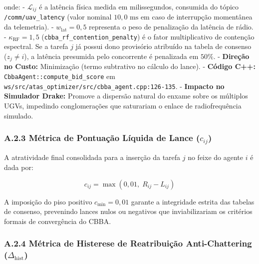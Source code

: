 \documentclass[
  brazilian,
  a4paper]{article}
\begin{document}
onde: - \(\mathcal{L}_{ij}\) é a latência física medida em
milissegundos, consumida do tópico \texttt{/\allowbreak{}comm/\allowbreak{}uav\_\allowbreak{}latency} (valor
nominal \(10{,}0\text{ ms}\) em caso de interrupção momentânea da
telemetria). - \(w_{\text{lat}} = 0{,}5\) representa o peso de
penalização da latência de rádio. - \(\kappa_{\text{RF}} = 1{,}5\)
(\texttt{cbba\_\allowbreak{}rf\_\allowbreak{}contention\_\allowbreak{}penalty}) é o fator multiplicativo de
contenção espectral. Se a tarefa \(j\) já possui dono provisório
atribuído na tabela de consenso (\(z_j \ne i\)), a latência presumida
pelo concorrente é penalizada em \(50\%\). - \textbf{Direção no Custo:}
Minimização (termo subtrativo no cálculo do lance). - \textbf{Código
C++:} \texttt{CbbaAgent:\allowbreak{}:\allowbreak{}compute\_\allowbreak{}bid\_\allowbreak{}score} em
\texttt{ws/\allowbreak{}src/\allowbreak{}atas\_\allowbreak{}optimizer/\allowbreak{}src/\allowbreak{}cbba\_\allowbreak{}agent.\allowbreak{}cpp:\allowbreak{}126-135}. -
\textbf{Impacto no Simulador Drake:} Promove a dispersão natural do
enxame sobre os múltiplos UGVs, impedindo conglomerações que saturariam
o enlace de radiofrequência simulado.

\subsubsection{\texorpdfstring{A.2.3 Métrica de Pontuação Líquida de
Lance
(\(c_{ij}\))}{A.2.3 Métrica de Pontuação Líquida de Lance (c\_\{ij\})}}\label{a.2.3-muxe9trica-de-pontuauxe7uxe3o-luxedquida-de-lance-c_ij}

A atratividade final consolidada para a inserção da tarefa \(j\) no
feixe do agente \(i\) é dada por:

\[c_{ij} = \max\left(0{,}01, \; R_{ij} - L_{ij}\right)\]

A imposição do piso positivo \(c_{\text{min}} = 0{,}01\) garante a
integridade estrita das tabelas de consenso, prevenindo lances nulos ou
negativos que inviabilizariam os critérios formais de convergência do
CBBA.

\subsubsection{\texorpdfstring{A.2.4 Métrica de Histerese de
Reatribuição Anti-Chattering
(\(\Delta_{\text{hist}}\))}{A.2.4 Métrica de Histerese de Reatribuição Anti-Chattering (\textbackslash Delta\_\{\textbackslash text\{hist\}\})}}\label{a.2.4-muxe9trica-de-histerese-de-reatribuiuxe7uxe3o-anti-chattering-delta_texthist}
\end{document}

